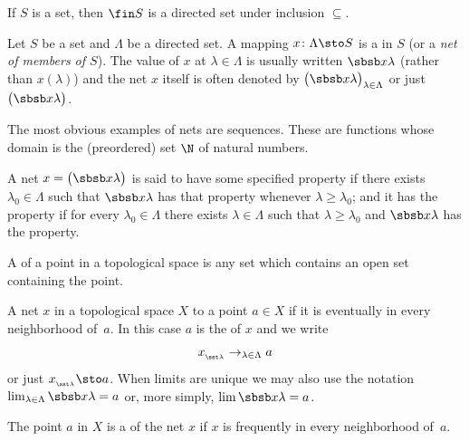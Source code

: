 \begin{exam}\label{C031414}  If $S$ is a set, then $\fin S$ is a directed set under
inclusion $\subseteq$.
\end{exam}

\begin{defn} Let $S$ be a set and $\Lambda$ be a directed set.  A mapping
$x\colon \Lambda \sto S$ is a
 in $S$ (or a \emph{net of members of $S$}). The value of $x$ at $\lambda \in
\Lambda$ is usually written $\sbsb x\lambda$ (rather than $x(\lambda)$) and the net $x$
itself is often denoted by $\bigl(\sbsb x\lambda\bigr)_{\lambda \in \Lambda}$ or just
$\bigl(\sbsb x\lambda\bigr)$.
\end{defn}

\begin{exam} The most obvious examples of nets are sequences.  These are functions whose domain is the (preordered) set $\N$ of natural numbers.
\end{exam}

\begin{defn} A net $x = \bigl(\sbsb x\lambda\bigr)$ is said to
 have some specified property if there exists $\lambda_0 \in \Lambda$ such that $\sbsb x\lambda$ has that property
whenever $\lambda \ge \lambda_0$; and it has the property
 if for every $\lambda_0 \in \Lambda$ there exists $\lambda \in \Lambda$ such that $\lambda \ge \lambda_0$
and $\sbsb x\lambda$ has the property.
\end{defn}

\begin{defn} A
 of a point in a topological space is any set which contains an open set containing the point.
\end{defn}

\begin{defn}  A net $x$ in a topological space $X$
 to a point $a \in X$ if it is eventually in every neighborhood of~$a$. In
this case $a$ is the
 of $x$ and we write
   \[ x_{{}_{\sst \lambda}} \to_{\lambda \in \Lambda}a \]
or just
$x_{{}_{\sst \lambda}} \sto a$.  When limits are unique we may also use the notation
$\lim_{\lambda \in \Lambda} \sbsb x\lambda = a$ or, more simply, $\lim \sbsb x\lambda =
a$.

The point $a$ in $X$ is a
 of the net $x$ if $x$ is frequently in every neighborhood of~$a$.
\end{defn}

